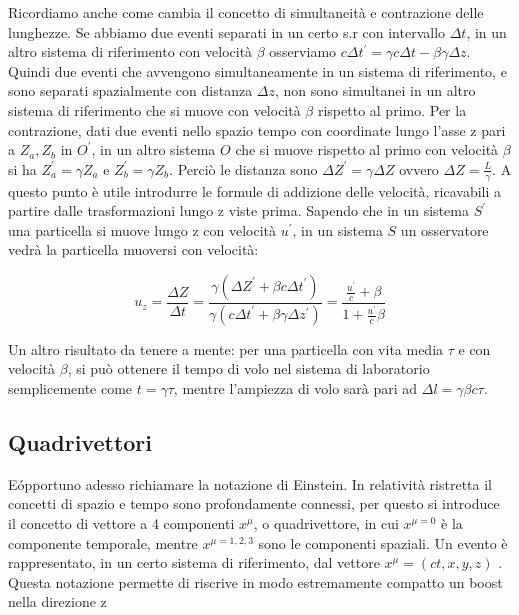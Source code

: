 \documentclass[12pt,a4paper,twoside]{book}
\begin{document}
Ricordiamo anche come cambia il concetto di simultaneità e contrazione delle lunghezze. Se abbiamo due eventi separati in un certo 
s.r con intervallo $\Delta t$, in un altro sistema di riferimento con velocità $\beta$ osserviamo $c \Delta t^{'} = \gamma c \Delta t - \beta \gamma \Delta z$. Quindi due eventi che avvengono simultaneamente in un sistema di riferimento, e sono separati spazialmente con distanza $\Delta z$, non sono simultanei in un altro sistema di riferimento che si muove con velocità $\beta$ rispetto al primo. 
Per la contrazione, dati due eventi nello spazio tempo con coordinate lungo l'asse z pari a $Z_a , Z_b$ in $O^{'}$, in un altro sistema $O$ che si muove rispetto al primo con velocità $\beta$ si ha $Z_{a}^{'} = \gamma Z_a$ e $Z_b^{'} = \gamma Z_b$. Perciò le distanza sono $\Delta Z^{'} = \gamma \Delta Z$ ovvero $\Delta Z = \frac{L}{\gamma}$. A questo punto è utile introdurre le formule di addizione delle velocità, ricavabili a partire dalle trasformazioni lungo z viste prima. Sapendo che in un sistema $S^{'}$ una particella si muove lungo z con velocità $u^{'}$, in un sistema $S$ un osservatore vedrà la particella muoversi con velocità:

\begin{equation}
u_z = \frac{\Delta Z}{\Delta t } = \dfrac{\gamma(\Delta Z^{'} + \beta c \Delta t ^{'})}{\gamma(c \Delta t^{'} + \beta \gamma \Delta z^{'})}  = \dfrac{\frac{u^{'}}{c} + \beta}{1 +  \frac{u^{'}}{c}\beta}
\end{equation}


Un altro risultato da tenere a mente: per una particella con vita media $\tau$ e con velocità $\beta$, si può ottenere il tempo di volo nel sistema di laboratorio semplicemente come $ t = \gamma \tau$, mentre l'ampiezza di volo sarà pari ad $\Delta l = \gamma \beta c  \tau$. 

\subsection{Quadrivettori}

E\' opportuno adesso richiamare la notazione di Einstein. In relatività ristretta il concetti di spazio e tempo sono profondamente connessi, per questo si introduce il concetto di vettore a 4 componenti $x^{\mu}$, o quadrivettore, in cui $x^{\mu = 0}$ è la componente temporale, mentre $x^{\mu = 1,2,3}$ sono le componenti spaziali. Un evento è rappresentato, in un certo sistema di riferimento, dal vettore $x^{\mu} = (ct, x , y, z)$ . Questa notazione permette di riscrive in modo estremamente compatto un boost nella direzione z 
\end{document}
